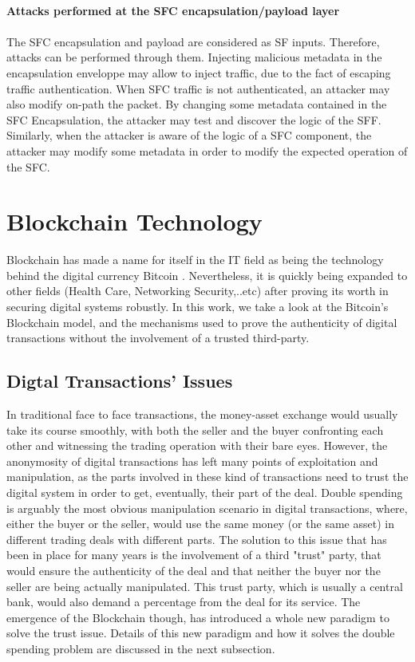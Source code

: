 \\
\textbf{Attacks performed at the SFC encapsulation/payload layer}\\ 
\\
The SFC encapsulation and payload are considered as SF inputs. Therefore, attacks can be performed through them. Injecting malicious metadata in the encapsulation enveloppe may allow to inject traffic, due to the fact of escaping traffic authentication. When SFC traffic is not authenticated, an attacker may also modify on-path the packet. By changing some metadata contained in the SFC Encapsulation, the attacker may test and discover the logic of the SFF. Similarly, when the attacker is aware of the logic of a SFC component, the attacker may modify some metadata in order to modify the expected operation of the SFC.
\newpage
\section{Blockchain Technology}
Blockchain has made a name for itself in the IT field as being the technology behind the digital currency Bitcoin \cite{satoshi}. Nevertheless,  it is quickly being expanded to other fields (Health Care, Networking Security,..etc) after proving its worth in securing digital systems robustly. In this work, we take a look at the Bitcoin's Blockchain model,  and the mechanisms used to prove the authenticity of digital transactions without the involvement of a trusted third-party.
\subsection{Digtal Transactions' Issues \cite{satoshi}}
In traditional face to face transactions, the money-asset exchange would usually take its course smoothly, with both the seller and the buyer confronting each other and witnessing the trading operation with their bare eyes. However, the anonymosity of digital transactions has left many points of exploitation and manipulation, as the parts involved in these kind of transactions need to trust the digital system in order to get, eventually, their part of the deal. Double spending is arguably the most obvious manipulation scenario in digital transactions, where, either the buyer or the seller, would use the same money (or the same asset) in different trading deals with different parts. The solution to this issue that has been in place for many years is the involvement of a third "trust" party, that would ensure the authenticity of the deal and that neither the buyer nor the seller are being actually manipulated. This trust party, which is usually a central bank, would also demand a percentage from the deal for its service. The emergence of the Blockchain though, has introduced a whole new paradigm to solve the trust issue. Details of this new paradigm and how it solves the double spending problem are discussed in the next subsection.

